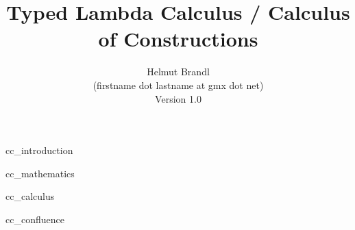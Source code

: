 \documentclass[12pt]{article}
\begin{document}


\title{
    Typed Lambda Calculus / Calculus of Constructions
}

\author{
    Helmut Brandl
    \\
    \scriptsize (firstname dot lastname at gmx dot net)
    \\
    \scriptsize Version 1.0
}
\date{}

\maketitle




\tableofcontents

 {cc_introduction}

 {cc_mathematics}

 {cc_calculus}

 {cc_confluence}






\end{document}
